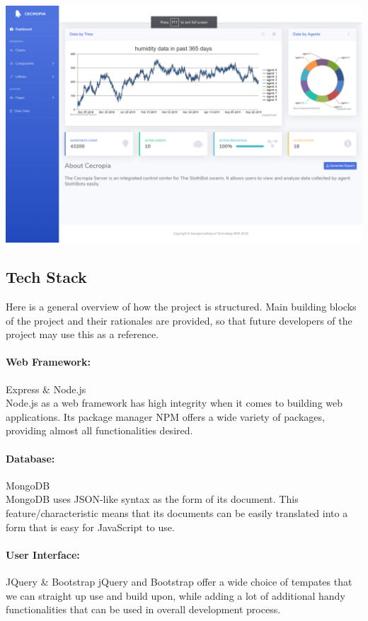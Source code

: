 \documentclass{article}
\begin{document}
\paragraph{}
\includegraphics[scale=0.5]{sample}

\newpage
\subsection{Tech Stack}
Here is a general overview of how the project is structured. Main building blocks of the project and their rationales are provided, 
so that future developers of the project may use this as a reference.
\paragraph{Web Framework:} Express \& Node.js\\
Node.js as a web framework has high integrity when it comes to building web applications. Its package manager 
NPM offers a wide variety of packages, providing almost all functionalities desired. 
\paragraph{Database:} MongoDB\\
MongoDB uses JSON-like syntax as the form of its document. This feature/characteristic means that its documents
can be easily translated into a form that is easy for JavaScript to use.
\paragraph{User Interface:} JQuery \& Bootstrap
jQuery and Bootstrap offer a wide choice of tempates that we can straight up use and build upon, while adding a lot of additional 
handy functionalities that can be used in overall development process.
\end{document}
